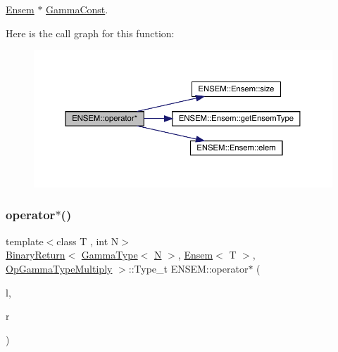 \mbox{\hyperlink{classENSEM_1_1Ensem}{Ensem}} $\ast$ \mbox{\hyperlink{classENSEM_1_1GammaConst}{Gamma\+Const}}. 

Here is the call graph for this function\+:\nopagebreak
\begin{figure}[H]
\begin{center}
\leavevmode
\includegraphics[width=350pt]{d1/d9e/group__eensem_gaada3f84ca5744bafe60557482cc90c26_cgraph}
\end{center}
\end{figure}
\mbox{\label{group__eensem_ga399b896691f2d528edcade561c6e571d}} 
\subsubsection{\texorpdfstring{operator$\ast$()}{operator*()}\hspace{0.1cm}{\footnotesize\ttfamily [6/11]}}
{\footnotesize\ttfamily template$<$class T , int N$>$ \\
\mbox{\hyperlink{structENSEM_1_1BinaryReturn}{Binary\+Return}}$<$ \mbox{\hyperlink{classENSEM_1_1GammaType}{Gamma\+Type}}$<$ \mbox{\hyperlink{adat__devel_2lib_2hadron_2operator__name__util_8cc_a7722c8ecbb62d99aee7ce68b1752f337}{N}} $>$, \mbox{\hyperlink{classENSEM_1_1Ensem}{Ensem}}$<$ T $>$, \mbox{\hyperlink{structENSEM_1_1OpGammaTypeMultiply}{Op\+Gamma\+Type\+Multiply}} $>$\+::Type\+\_\+t E\+N\+S\+E\+M\+::operator$\ast$ (\begin{DoxyParamCaption}\item[{const \mbox{\hyperlink{classENSEM_1_1GammaType}{Gamma\+Type}}$<$ \mbox{\hyperlink{adat__devel_2lib_2hadron_2operator__name__util_8cc_a7722c8ecbb62d99aee7ce68b1752f337}{N}} $>$ \&}]{l,  }\item[{const \mbox{\hyperlink{classENSEM_1_1Ensem}{Ensem}}$<$ T $>$ \&}]{r }\end{DoxyParamCaption})\hspace{0.3cm}{\ttfamily [inline]}}




